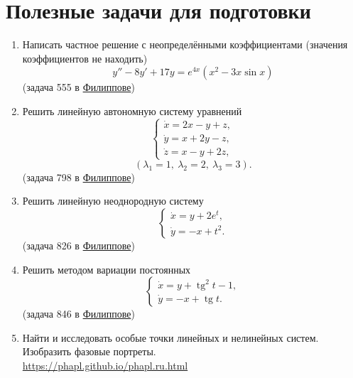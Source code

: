 \documentclass{article}
\DeclareMathOperator{\tg}{tg}
\begin{document}
\section{Полезные задачи для подготовки}
\begin{enumerate}
    \item Написать частное решение с неопределёнными коэффициентами (значения коэффициентов не находить) $$y''-8y'+17y=e^{4x}(x^2-3x\sin x)$$ (задача 555 в \href{https://drive.google.com/file/d/1vhpR3QoXntqlk_SoChT8c3pDvJQR_b-S/view?usp=drive_link}{Филиппове}) \\

    \item Решить линейную автономную систему уравнений
    $$
        \begin{cases} \dot{x}=2x-y+z, \\ \dot{y}=x+2y-z, \\ \dot{z}=x-y+2z,
        \end{cases}
    $$
    $$(\lambda_1=1,\ \lambda_2=2,\ \lambda_3=3).$$
    (задача 798 в \href{https://drive.google.com/file/d/1vhpR3QoXntqlk_SoChT8c3pDvJQR_b-S/view?usp=drive_link}{Филиппове}) \\

    \item Решить линейную неоднородную систему
    $$
        \begin{cases} \dot{x}=y+2e^{t}, \\ \dot{y}=-x+t^{2}.
        \end{cases}
    $$
    (задача 826 в \href{https://drive.google.com/file/d/1vhpR3QoXntqlk_SoChT8c3pDvJQR_b-S/view?usp=drive_link}{Филиппове}) \\

    \item Решить методом вариации постоянных
    $$
        \begin{cases} \dot{x}=y+\tg^{2}t-1, \\ \dot{y}=-x+\tg t.
        \end{cases}
    $$
    (задача 846 в \href{https://drive.google.com/file/d/1vhpR3QoXntqlk_SoChT8c3pDvJQR_b-S/view?usp=drive_link}{Филиппове}) \\ 
    
    \item Найти и исследовать особые точки линейных и нелинейных систем. Изобразить фазовые портреты. \\ 
    \url{https://phapl.github.io/phapl.ru.html} \\



\end{enumerate}
\end{document}
